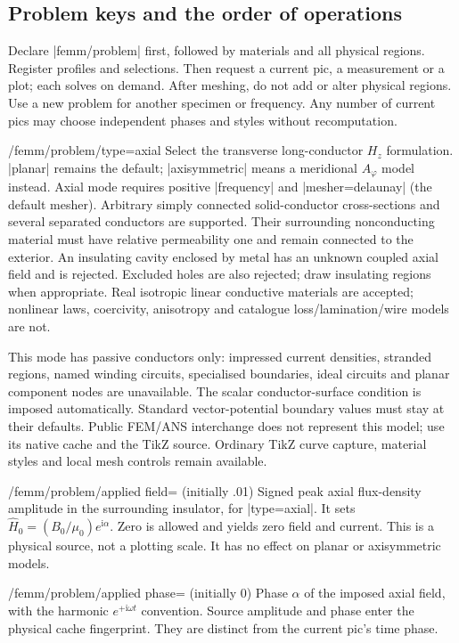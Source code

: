 
\subsection{Problem keys and the order of operations}
Declare |femm/problem| first, followed by materials and all physical regions.
Register profiles and selections. Then request a current pic, a measurement or
a plot; each solves on demand. After meshing, do not add or alter physical
regions. Use a new problem for another specimen or frequency. Any number of
current pics may choose independent phases and styles without recomputation.

\begin{key}{/femm/problem/type=axial}
Select the transverse long-conductor $H_z$ formulation. |planar| remains the
default; |axisymmetric| means a meridional $A_\varphi$ model instead.
Axial mode requires positive |frequency| and |mesher=delaunay| (the default
mesher). Arbitrary simply connected solid-conductor cross-sections and several
separated conductors are supported. Their surrounding nonconducting material
must have relative permeability one and remain connected to the exterior.
An insulating cavity enclosed by metal has an unknown coupled axial field and
is rejected. Excluded holes are also rejected; draw insulating regions when
appropriate. Real isotropic linear conductive materials are accepted; nonlinear
laws, coercivity, anisotropy and catalogue loss/lamination/wire models are not.

This mode has passive conductors only: impressed current densities, stranded
regions, named winding circuits, specialised boundaries, ideal circuits and
planar component nodes are unavailable. The scalar conductor-surface condition
is imposed automatically. Standard vector-potential boundary values must stay
at their defaults. Public FEM/ANS interchange does not represent this model;
use its native cache and the TikZ source. Ordinary TikZ curve capture, material
styles and local mesh controls remain available.
\end{key}
\begin{key}{/femm/problem/applied field= (initially .01)}
Signed peak axial flux-density amplitude in the surrounding insulator, for
|type=axial|. It sets $\widehat H_0=(B_0/\mu_0)e^{\mathrm i\alpha}$.
Zero is allowed and yields zero field and current. This is a physical source,
not a plotting scale. It has no effect on planar or axisymmetric models.
\end{key}
\begin{key}{/femm/problem/applied phase= (initially 0)}
Phase $\alpha$ of the imposed axial field, with the harmonic
$e^{+\mathrm i\omega t}$ convention. Source amplitude and phase enter the
physical cache fingerprint. They are distinct from the current pic's time phase.
\end{key}

